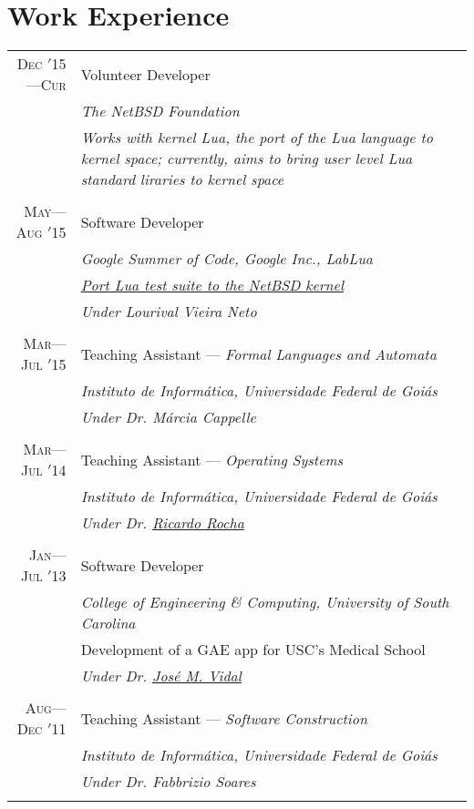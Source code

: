 \documentclass[a4paper,10pt]{article}
\begin{document}
\section{Work Experience}
\begin{tabular}{r|p{11cm}}

  \textsc{Dec $'$15---Cur}
  & Volunteer Developer\\
  &\emph{The NetBSD Foundation}\\
  &\emph{\footnotesize{Works with kernel Lua, the port of the Lua language to
  						kernel space; currently, aims to bring user level
						Lua standard liraries to kernel space}}
  \\\multicolumn{2}{c}{} \\
  
  \textsc{May---Aug $'$15}
  & Software Developer\\
  &\emph{Google Summer of Code, Google Inc., LabLua}\\
  &\emph{\footnotesize{\href{https://www.google-melange.com/gsoc/project/details/google/gsoc2015/gmesalazar/5741031244955648}{Port Lua test suite to the NetBSD kernel}}}\\
  &\emph{Under Lourival Vieira Neto}
  \\\multicolumn{2}{c}{} \\

  \textsc{Mar---Jul $'$15}
  & Teaching Assistant --- \emph{Formal Languages and Automata}\\
  &\emph{Instituto de Informática, Universidade Federal de Goiás}\\
  &\emph{Under Dr. {Márcia Cappelle}}
  \\\multicolumn{2}{c}{} \\

  \textsc{Mar---Jul $'$14}
  & Teaching Assistant --- \emph{Operating Systems}\\
  &\emph{Instituto de Informática, Universidade Federal de Goiás}\\
  &\emph{Under Dr. \href{http://inf.ufg.br/~ricardo/}{Ricardo Rocha}}
  \\\multicolumn{2}{c}{} \\

  \textsc{Jan---Jul $'$13}
  & Software Developer\\
  &\emph{College of Engineering \& Computing, University of South Carolina}\\
  &\footnotesize{Development of a GAE app for USC's Medical School}\\
  &\emph{Under Dr. \href{http://jmvidal.cse.sc.edu}{José M. Vidal}}
  \\\multicolumn{2}{c}{} \\

  \textsc{Aug---Dec $'$11}
  & Teaching Assistant --- \emph{Software Construction}\\
  &\emph{Instituto de Informática, Universidade Federal de Goiás}\\
  &\emph{Under Dr. Fabbrizio Soares}
  \\\multicolumn{2}{c}{} \\

\end{tabular}
\end{document}
